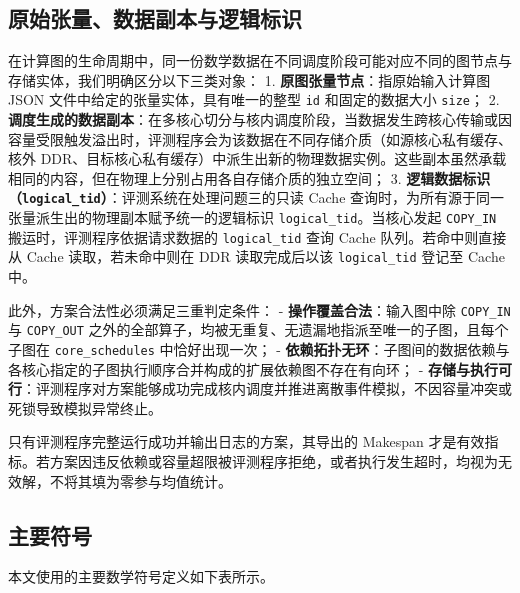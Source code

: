 \documentclass[anonymous,notoc]{gmcm2026}
\begin{document}
\subsection{原始张量、数据副本与逻辑标识}

在计算图的生命周期中，同一份数学数据在不同调度阶段可能对应不同的图节点与存储实体，我们明确区分以下三类对象： 1. \textbf{原图张量节点}：指原始输入计算图 JSON 文件中给定的张量实体，具有唯一的整型 \texttt{id} 和固定的数据大小 \texttt{size}； 2. \textbf{调度生成的数据副本}：在多核心切分与核内调度阶段，当数据发生跨核心传输或因容量受限触发溢出时，评测程序会为该数据在不同存储介质（如源核心私有缓存、核外 DDR、目标核心私有缓存）中派生出新的物理数据实例。这些副本虽然承载相同的内容，但在物理上分别占用各自存储介质的独立空间； 3. \textbf{逻辑数据标识（\texttt{logical\_tid}）}：评测系统在处理问题三的只读 Cache 查询时，为所有源于同一张量派生出的物理副本赋予统一的逻辑标识 \texttt{logical\_tid}。当核心发起 \texttt{COPY\_IN} 搬运时，评测程序依据请求数据的 \texttt{logical\_tid} 查询 Cache 队列。若命中则直接从 Cache 读取，若未命中则在 DDR 读取完成后以该 \texttt{logical\_tid} 登记至 Cache 中。

此外，方案合法性必须满足三重判定条件： - \textbf{操作覆盖合法}：输入图中除 \texttt{COPY\_IN} 与 \texttt{COPY\_OUT} 之外的全部算子，均被无重复、无遗漏地指派至唯一的子图，且每个子图在 \texttt{core\_schedules} 中恰好出现一次； - \textbf{依赖拓扑无环}：子图间的数据依赖与各核心指定的子图执行顺序合并构成的扩展依赖图不存在有向环； - \textbf{存储与执行可行}：评测程序对方案能够成功完成核内调度并推进离散事件模拟，不因容量冲突或死锁导致模拟异常终止。

只有评测程序完整运行成功并输出日志的方案，其导出的 Makespan 才是有效指标。若方案因违反依赖或容量超限被评测程序拒绝，或者执行发生超时，均视为无效解，不将其填为零参与均值统计。

\subsection{主要符号}

本文使用的主要数学符号定义如下表所示。
\end{document}
